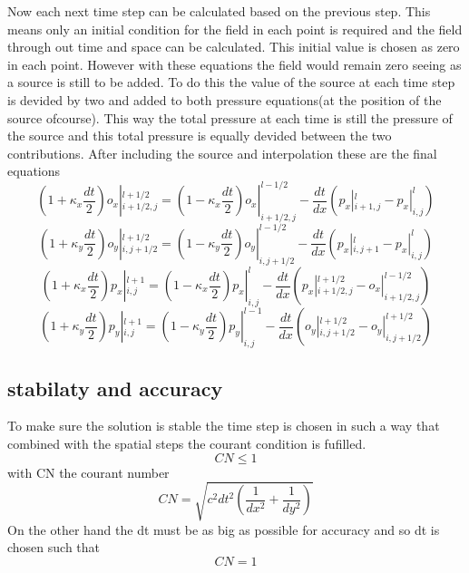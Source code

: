 \documentclass{article}
\begin{document}
Now each next time step can be calculated based on the previous step.
This means only an initial condition for the field in each point is required and the field through out time and space can be calculated. This initial value is chosen as zero in each point. However with these equations the field would remain zero seeing as a source is still to be added. To do this the value of the source at each time step is devided by two and added to both pressure equations(at the position of the source ofcourse). This way the total pressure at each time is still the pressure of the source and this total pressure is equally devided between the two contributions. After including the source and interpolation these are the final equations
\begin{equation}
    (1+\kappa_x\frac{dt}{2})o_x|_{i+1/2,j}^{l+1/2}=(1-\kappa_x\frac{dt}{2})o_x|_{i+1/2,j}^{l-1/2}-\frac{dt}{dx}(p_x|_{i+1,j}^l-p_x|_{i,j}^l)
\end{equation}
\begin{equation}
    (1+\kappa_y\frac{dt}{2})o_y|_{i,j+1/2}^{l+1/2}=(1-\kappa_y\frac{dt}{2})o_y|_{i,j+1/2}^{l-1/2}-\frac{dt}{dx}(p_x|_{i,j+1}^l-p_x|_{i,j}^l)
\end{equation}
\begin{equation}
    (1+\kappa_x\frac{dt}{2})p_x|_{i,j}^{l+1}=(1-\kappa_x\frac{dt}{2})p_x|_{i,j}^{l}-\frac{dt}{dx}(p_x|_{i+1/2,j}^{l+1/2}-o_x|_{i+1/2,j}^{l-1/2})
\end{equation}
\begin{equation}
    (1+\kappa_y\frac{dt}{2})p_y|_{i,j}^{l+1}=(1-\kappa_y\frac{dt}{2})p_y|_{i,j}^{l-1}-\frac{dt}{dx}(o_y|_{i,j+1/2}^{l+1/2}-o_y|_{i,j+1/2}^{l+1/2})
\end{equation}
\subsection{stabilaty and accuracy}
To make sure the solution is stable the time step is chosen in such a way that combined with the spatial steps the courant condition is fufilled.
\begin{equation}
    CN \le 1
\end{equation}
with CN the courant number 
\begin{equation}
    CN=\sqrt{c^2dt^2(\frac{1}{dx^2}+\frac{1}{dy^2})}
\end{equation}
On the other hand the dt must be as big as possible for accuracy and so dt is chosen such that 
\begin{equation}
    CN=1
\end{equation}
\end{document}
